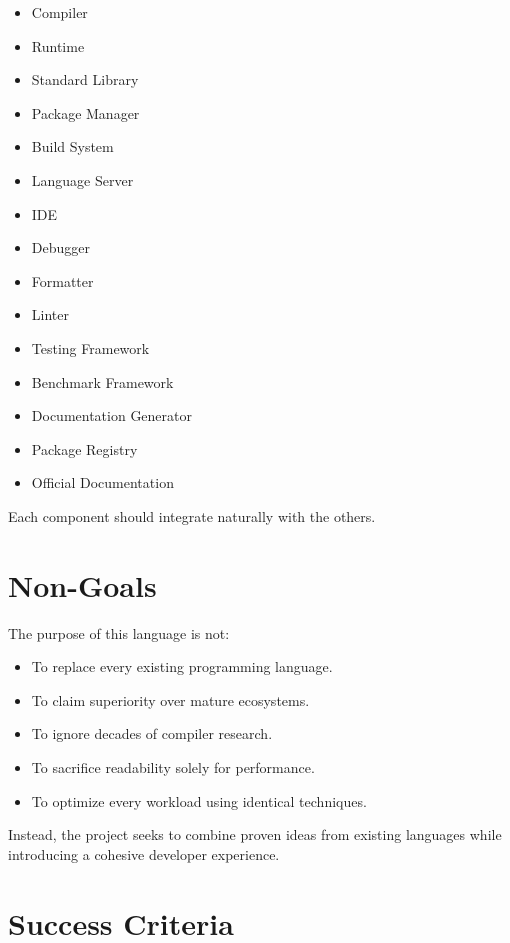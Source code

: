 \documentclass[12pt]{article}
\begin{document}
\begin{itemize}
    \item Compiler
    \item Runtime
    \item Standard Library
    \item Package Manager
    \item Build System
    \item Language Server
    \item IDE
    \item Debugger
    \item Formatter
    \item Linter
    \item Testing Framework
    \item Benchmark Framework
    \item Documentation Generator
    \item Package Registry
    \item Official Documentation
\end{itemize}

Each component should integrate naturally with the others.


\section{Non-Goals}

The purpose of this language is not:

\begin{itemize}
    \item To replace every existing programming language.
    \item To claim superiority over mature ecosystems.
    \item To ignore decades of compiler research.
    \item To sacrifice readability solely for performance.
    \item To optimize every workload using identical techniques.
\end{itemize}

Instead, the project seeks to combine proven ideas from existing languages while introducing a cohesive developer experience.


\section{Success Criteria}
\end{document}
